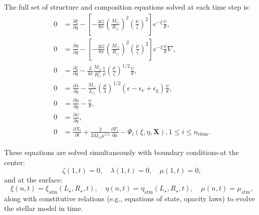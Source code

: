 \documentclass[12pt,a4paper]{article}
\newcommand{\mr}{\mathrm}
\newcommand{\pfird}[2][]{\frac{\partial#1}{\partial#2}}
\newcommand{\bvec}[1]{\boldsymbol{#1}}
\begin{document}
The full set of structure and composition equations solved at each time step is:
\begin{subequations} \label{eq:cesam2k20_struct_eq}
  \begin{align}
    0 &= \pfird[\xi]{q} - \left[-\frac{3G}{8\pi}\left(\frac{M_\odot}{R_\odot}\right)^2\left(\frac{\mu}{\zeta}\right)^2\right]e^{-\xi}\frac{\psi}{\theta}, \label{eq:cesam_struct1}\\
    0 &= \pfird[\eta]{q} - \left[-\frac{3G}{8\pi}\left(\frac{M_\odot}{R_\odot}\right)^2\left(\frac{\mu}{\zeta}\right)^2\right]e^{-\xi}\frac{\psi}{\theta}\nabla, \label{eq:cesam_struct2}\\
    0 &= \pfird[\zeta]{q} - \frac{3}{4\pi}\frac{M_\odot}{R_\odot^3}\frac{1}{\rho}\left(\frac{\mu}{\zeta}\right)^{1/2}\frac{\psi}{\theta}, \label{eq:cesam_struct3}\\
    0 &= \pfird[\lambda]{q} - \frac{M_\odot}{L_\odot}\left(\frac{\mu}{\lambda}\right)^{1/2}(\epsilon  - \epsilon_\nu + \epsilon_\mr{g})\frac{\psi}{\theta}, \label{eq:cesam_struct4}\\
    0 &= \pfird[\mu]{q} - \frac{\psi}{\theta}, \label{eq:cesam_struct5}\\
    0 &= \pfird[\psi]{q}, \label{eq:cesam_struct6}\\
    0 &= \pfird[X_i]{t} + \frac{2}{3 M_\odot\mu^{1/2}}\pfird[F_i]{\mu} - \Psi_i(\xi, \eta, \bvec{X}), 1\leq i \leq n_\mr{elem}. \label{eq:cesam_struct7}
  \end{align}
\end{subequations}

These equations are solved simultaneously with boundary conditions-at the center:
\begin{equation}
  \zeta(1, t) = 0,\quad \lambda(1, t) =0, \quad \mu(1, t) = 0,
\end{equation}
and at the surface:
\begin{equation}
  \xi(n, t) = \xi_\mr{atm}(L_\star, R_\star, t),\quad \eta(n, t) = \eta_\mr{atm}(L_\star, R_\star, t),\quad \mu(n, t) = \mu_\mr{atm},
\end{equation}
along with constitutive relations (e.g., equations of state, opacity laws) to evolve the stellar model in time.
\end{document}
